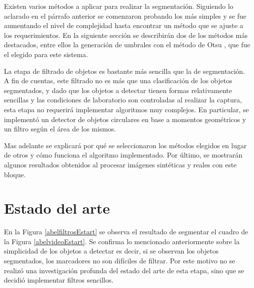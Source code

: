Existen varios métodos a aplicar para realizar la segmentación. Siguiendo lo aclarado en el párrafo anterior se comenzaron probando los más simples y se fue aumentando el nivel de complejidad hasta encontrar un método que se ajuste a los requerimientos. En la siguiente sección se describirán dos de los métodos más destacados, entre ellos la generación de umbrales con el método de Otsu \cite{otsu}, que fue el elegido para este sistema.

La etapa de filtrado de objetos es bastante más sencilla que la de segmentación. A fin de cuentas, este filtrado no es más que una clasificación de los objetos segmentados, y dado que los objetos a detectar tienen formas relativamente sencillas y las condiciones de laboratorio son controladas al realizar la captura, esta etapa no requerirá implementar algoritmos muy complejos. En particular, se implementó un detector de objetos circulares en base a momentos geométricos y un filtro según el área de los mismos.

Mas adelante se explicará por qué se seleccionaron los métodos elegidos en lugar de otros y cómo funciona el algoritmo implementado. Por último, se mostrarán algunos resultados obtenidos al procesar imágenes sintéticas y reales con este bloque.

\section{Estado del arte}%
\label{segEstArt}

En la Figura \ref{abelfiltrosEstart} se observa el resultado de segmentar el cuadro de la Figura \ref{abelvideoEstart}. Se confirma lo mencionado anteriormente sobre la simplicidad de los objetos a detectar es decir, si se observan los objetos segmentados, los marcadores no son difíciles de filtrar. Por este motivo no se realizó una investigación profunda del estado del arte de esta etapa, sino que se decidió implementar filtros sencillos.

